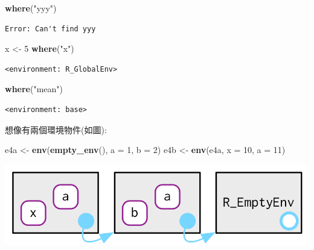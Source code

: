 \documentclass[]{book}
\newenvironment{Shaded}{\begin{snugshade}}{\end{snugshade}}
\newcommand{\DataTypeTok}[1]{\textcolor[rgb]{0.13,0.29,0.53}{#1}}
\newcommand{\DecValTok}[1]{\textcolor[rgb]{0.00,0.00,0.81}{#1}}
\newcommand{\KeywordTok}[1]{\textcolor[rgb]{0.13,0.29,0.53}{\textbf{#1}}}
\newcommand{\NormalTok}[1]{#1}
\newcommand{\StringTok}[1]{\textcolor[rgb]{0.31,0.60,0.02}{#1}}
\theoremstyle{definition}
\theoremstyle{definition}
\theoremstyle{definition}
\theoremstyle{remark}
\begin{document}
\begin{Shaded}
\begin{Highlighting}[]
\KeywordTok{where}\NormalTok{(}\StringTok{"yyy"}\NormalTok{)}
\end{Highlighting}
\end{Shaded}

\begin{verbatim}
Error: Can't find yyy
\end{verbatim}

\begin{Shaded}
\begin{Highlighting}[]
\NormalTok{x <-}\StringTok{ }\DecValTok{5}
\KeywordTok{where}\NormalTok{(}\StringTok{"x"}\NormalTok{)}
\end{Highlighting}
\end{Shaded}

\begin{verbatim}
<environment: R_GlobalEnv>
\end{verbatim}

\begin{Shaded}
\begin{Highlighting}[]
\KeywordTok{where}\NormalTok{(}\StringTok{"mean"}\NormalTok{)}
\end{Highlighting}
\end{Shaded}

\begin{verbatim}
<environment: base>
\end{verbatim}

想像有兩個環境物件(如圖):

\begin{Shaded}
\begin{Highlighting}[]
\NormalTok{e4a <-}\StringTok{ }\KeywordTok{env}\NormalTok{(}\KeywordTok{empty_env}\NormalTok{(), }\DataTypeTok{a =} \DecValTok{1}\NormalTok{, }\DataTypeTok{b =} \DecValTok{2}\NormalTok{)}
\NormalTok{e4b <-}\StringTok{ }\KeywordTok{env}\NormalTok{(e4a, }\DataTypeTok{x =} \DecValTok{10}\NormalTok{, }\DataTypeTok{a =} \DecValTok{11}\NormalTok{)}
\end{Highlighting}
\end{Shaded}

\begin{center}\includegraphics{diagrams/environments/where-ex} \end{center}
\end{document}

